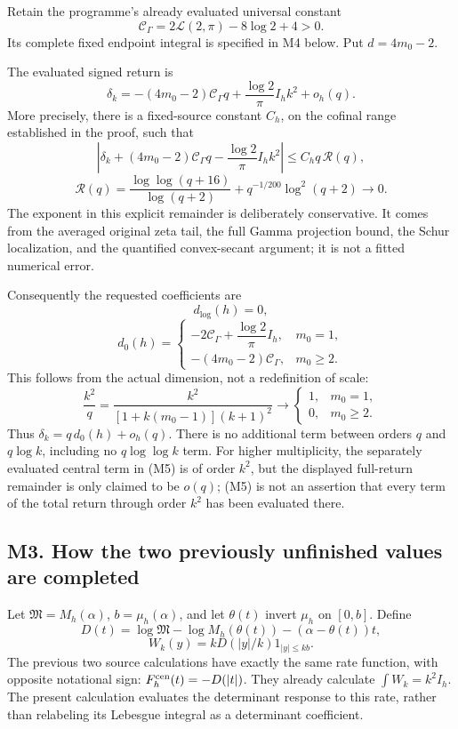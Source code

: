Retain the programme's already evaluated universal constant \[
\boxed{\mathcal C_\Gamma=2\mathcal L(2,\pi)-8\log2+4>0.}\tag{M4}
\] Its complete fixed endpoint integral is specified in M4 below. Put
\(d=4m_0-2\).

The evaluated signed return is \[
\boxed{\delta_k
=-(4m_0-2)\mathcal C_\Gamma q
+\frac{\log2}{\pi}I_h k^2+o_h(q).}\tag{M5}
\] More precisely, there is a fixed-source constant \(C_h\), on the
cofinal range established in the proof, such that \[
\boxed{
\left|\delta_k+(4m_0-2)\mathcal C_\Gamma q
-\frac{\log2}{\pi}I_h k^2\right|
\le C_hq\,\mathscr R(q),
}\tag{M6}
\] \[
\mathscr R(q)=
\frac{\log\log(q+16)}{\log(q+2)}
+q^{-1/200}\log^2(q+2)
\longrightarrow0.
\] The exponent in this explicit remainder is deliberately conservative.
It comes from the averaged original zeta tail, the full Gamma projection
bound, the Schur localization, and the quantified convex-secant
argument; it is not a fitted numerical error.

Consequently the requested coefficients are \[
\boxed{d_{\log}(h)=0,}\tag{M7}
\] \[
\boxed{
 d_0(h)=
 \begin{cases}
 -2\mathcal C_\Gamma+\dfrac{\log2}{\pi}I_h,&m_0=1,\\[5pt]
 -(4m_0-2)\mathcal C_\Gamma,&m_0\ge2.
 \end{cases}}
\tag{M8}
\] This follows from the actual dimension, not a redefinition of scale:
\[
\frac{k^2}{q}=
\frac{k^2}{[1+k(m_0-1)](k+1)^2}
\longrightarrow
\begin{cases}1,&m_0=1,\\0,&m_0\ge2.\end{cases}
\] Thus \(\delta_k=q\,d_0(h)+o_h(q)\). There is no additional term
between orders \(q\) and \(q\log k\), including no \(q\log\log k\) term.
For higher multiplicity, the separately evaluated central term in (M5)
is of order \(k^2\), but the displayed full-return remainder is only
claimed to be \(o(q)\); (M5) is not an assertion that every term of the
total return through order \(k^2\) has been evaluated there.

\subsection{M3. How the two previously unfinished values are
completed}\label{sa:m3.-how-the-two-previously-unfinished-values-are-completed}

Let \(\mathfrak M=M_h(\alpha)\), \(b=\mu_h(\alpha)\), and let
\(\theta(t)\) invert \(\mu_h\) on \([0,b]\). Define \[
D(t)=\log\mathfrak M-\log M_h(\theta(t))-(\alpha-\theta(t))t,
\] \[
W_k(y)=kD(|y|/k)1_{|y|\le kb}.
\] The previous two source calculations have exactly the same rate
function, with opposite notational sign: \(F_h^{\rm cen}(t)=-D(|t|)\).
They already calculate \(\int W_k=k^2I_h\). The present calculation
evaluates the determinant response to this rate, rather than relabeling
its Lebesgue integral as a determinant coefficient.

